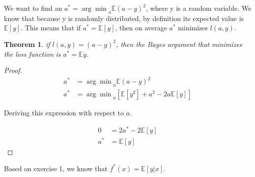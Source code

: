\documentclass[
course = {{Foundations of Machine Learning}},
quartile = {{1}},
assignment = 1,
name = {{Samir Salmen}},
studentnumber = {{NUSP: 11298636}},
email = {{samir.salmen@usp.br}},
firstexercise = 1
]{aga-homework}
\newtheorem*{theorem*}{Theorem}
\begin{document}
	
	\exercise
		We want to find an $a^* = {\arg\min}_a \mathbb{E}(a-y)^2$, where y is a random variable. We know that because y is randomly distributed, by definition its expected value is $\mathbb{E}[y]$. This means that if $a^* = \mathbb{E}[y]$, then on average $a^*$ minimizes $l(a, y)$.
		
		\begin{theorem*}
			if $l(a,y) = (a-y)^2$, then the Bayes argument that minimizes the loss function is $a^* = \mathbb{E}y$.
		\end{theorem*}
		\begin{proof}
			 \begin{align*}
			 	a^* &= {\arg\min}_a \mathbb{E}(a-y)^2\\
			 	a^* &= {\arg\min}_a [\mathbb{E}[y^2] + a^2 - 2a\mathbb{E}[y]]	
			 \end{align*}
		 
		 Deriving this expression with respect to $a$.
			 
			 \begin{align*}
			 	0 &= 2a^* - 2\mathbb{E}[y]\\
			 	a^* &= \mathbb{E}[y]
			 \end{align*}
			 
		\end{proof}




	\exercise
		\subexercise
			Based on exercise 1, we know that $f^*(x) = \mathbb{E}[y|x]$.
		\subexercise
			
	
\end{document}

